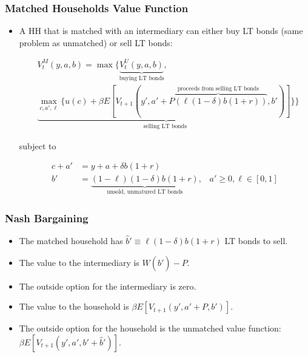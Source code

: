 \documentclass{beamer}
\begin{document}
\begin{frame}
\frametitle{Matched Households Value Function}

\begin{itemize}[<+->]

\item A HH that is matched with an intermediary can either buy LT bonds (same problem as unmatched) or sell LT bonds:

\begin{align*}
&V_{t}^M(y, a, b) 
= \max
\Bigg\{ 
\underbrace{ V_t^U(y, a, b)}_{\text{buying LT bonds}},\\&\underbrace{ \max_{c, a', \ell} 
\Bigg\{ u(c) + \beta E[V_{t+1}(y', a'+\overbrace{P(\ell (1-\delta)b(1+r))}^{\text{proceeds from selling LT bonds}}, b')] \Bigg\}}_{\text{selling LT bonds }} \Bigg\}
\end{align*}

subject to

\begin{align*}
c + a' &= y + a + \delta b (1 + r)\\
b' &= \underbrace{(1-\ell)(1-\delta)b(1+r)}_{\text{unsold, unmatured LT bonds}}, \; \; \; a' \ge 0, \ell \in [0, 1]
\end{align*}

\end{itemize}

\end{frame}









\begin{frame}
\frametitle{Nash Bargaining}

\begin{itemize}[<+->]

\item The matched household has $\hat{b}' \equiv \ell(1-\delta)b(1+r)$ LT bonds to sell.

\bigskip

\item The value to the intermediary is $W(\hat{b}') - P$.

\bigskip

\item The outside option for the intermediary is zero. 

\bigskip

\item The value to the household is $\beta E[V_{t+1}(y', a' + P, b')]$.

\bigskip

\item The outside option for the household is the unmatched value function: $\beta E[V_{t+1}(y', a', b' + \hat{b}')]$.

\end{itemize}

\end{frame}
\end{document}
